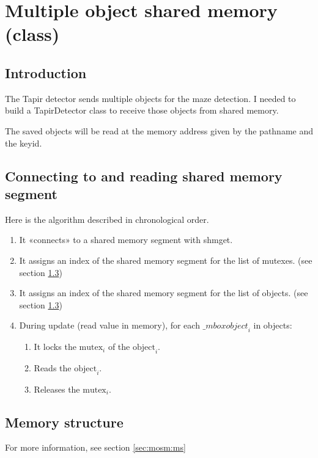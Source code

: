\section{Multiple object shared memory (class)}
\label{sec:mosmc}

\subsection{Introduction}
\label{sec:mosmc:intro}

The Tapir detector sends multiple objects for the maze detection. I 
needed to build a TapirDetector class to receive those objects from 
shared memory.

The saved objects will be read at the memory address given by the 
pathname and the keyid.

\subsection{Connecting to and reading shared memory segment}
\label{sec:mosmc:algo}
Here is the algorithm described in chronological order.

    \begin{enumerate}
        \item It «connects» to a shared memory segment with shmget.
        \item It assigns an index of the shared memory segment for the list 
            of mutexes. (see section \ref{sec:mosmc:ms})
        \item It assigns an index of the shared memory segment for the list 
            of objects. (see section \ref{sec:mosmc:ms})
        \item During update (read value in memory), for each 
            $\_mbox{object}_i$ in objects:
        \begin{enumerate}
           \item It locks the $\mbox{mutex}_i$ of the $\mbox{object}_i$.
            \item Reads the $\mbox{object}_i$.
            \item Releases the $\mbox{mutex}_i$.
        \end{enumerate}
 
    \end{enumerate}

\subsection{Memory structure}
\label{sec:mosmc:ms}
For more information, see section \ref{sec:mosm:ms}

